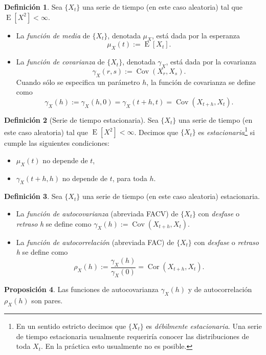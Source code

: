 \documentclass[11pt,letterpaper]{article}
\newcommand{\expected}{\ensuremath{\operatorname{E}}}
\newcommand{\covariance}{\ensuremath{\operatorname{Cov}}}
\newcommand{\correlation}{\ensuremath{\operatorname{Cor}}}
\theoremstyle{definition}
\newtheorem{definition}{Definición}[section]
\theoremstyle{theorem}
\newtheorem{proposition}[definition]{Proposición}
\theoremstyle{remark}
\begin{document}
	\begin{definition}
		Sea \(\{X_t\}\) una serie de tiempo (en este caso aleatoria) tal que \(\expected\left[X^2\right]<\infty\).
		\begin{itemize}
			\item La \textit{función de media} de \(\{X_t\}\), denotada \(\mu_X\), está dada por la esperanza \[\mu_X(t):=\expected[X_t].\]
			\item La \textit{función de covarianza} de \(\{X_t\}\), denotada \(\gamma_X\), está dada por la covarianza \[\gamma_X(r,s):=\covariance(X_r,X_s).\] Cuando sólo se especifica un parámetro \(h\), la función de covarianza se define como \[\gamma_X(h):=\gamma_X(h,0)=\gamma_X(t+h,t)=\covariance(X_{t+h},X_t).\]
		\end{itemize}
	\end{definition}
	\begin{definition}[Serie de tiempo estacionaria]
		Sea \(\{X_t\}\) una serie de tiempo (en este caso aleatoria) tal que \(\expected\left[X^2\right]<\infty\). Decimos que \(\{X_t\}\) es \textit{estacionaria}\footnote{En un sentido estricto decimos que \(\{X_t\}\) es \textit{débilmente estacionaria}. Una serie de tiempo estacionaria usualmente requeriría conocer las distribuciones de toda \(X_t\). En la práctica esto usualmente no es posible.} si cumple las siguientes condiciones:
		\begin{itemize}
			\item \(\mu_X(t)\) no depende de \(t\),
			\item \(\gamma_X(t+h,h)\) no depende de \(t\), para toda \(h\).
		\end{itemize}
	\end{definition}
	\begin{definition}
		Sea \(\{X_t\}\) una serie de tiempo (en este caso aleatoria) estacionaria.
		\begin{itemize}
			\item La \textit{función de autocovarianza} (abreviada FACV) de \(\{X_t\}\) con \textit{desfase} o \textit{retraso} \textit{h} se define como \(\gamma_X(h):=\covariance(X_{t+h},X_t)\).
			\item La \textit{función de autocorrelación} (abreviada FAC) de \(\{X_t\}\) con \textit{desfase} o \textit{retraso} \textit{h} se define como \[\rho_X(h):=\frac{\gamma_X(h)}{\gamma_X(0)}=\correlation(X_{t+h},X_t).\]
		\end{itemize}
	\end{definition}
	\begin{proposition} \label{proposPar}
		Las funciones de autocovarianza \(\gamma_X(h)\) y de autocorrelación \(\rho_X(h)\) son pares.
	\end{proposition}
\end{document}
